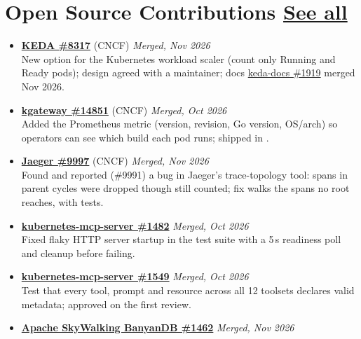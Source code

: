 \section*{Open Source Contributions \hfill
\href{https://uchihaithachi.github.io/cv/open-source.html}{See all}}
\BigDivider
\begin{itemize}[leftmargin=*, itemsep=0.3em, topsep=0.1em]
  \item \textbf{\href{https://github.com/kedacore/keda/pull/8317}{KEDA \#8317}} (CNCF) \hfill \textit{Merged, Nov 2026}\\
    New  option for the Kubernetes workload scaler (count only Running and Ready pods); design agreed with a maintainer; docs \href{https://github.com/kedacore/keda-docs/pull/1919}{keda-docs \#1919} merged Nov 2026.
  \item \textbf{\href{https://github.com/kgateway-dev/kgateway/pull/14851}{kgateway \#14851}} (CNCF) \hfill \textit{Merged, Oct 2026}\\
    Added the  Prometheus metric (version, revision, Go version, OS/arch) so operators can see which build each pod runs; shipped in .
  \item \textbf{\href{https://github.com/jaegertracing/jaeger/pull/9997}{Jaeger \#9997}} (CNCF) \hfill \textit{Merged, Nov 2026}\\
    Found and reported (\#9991) a bug in Jaeger's  trace-topology tool: spans in parent cycles were dropped though still counted; fix walks the spans no root reaches, with tests.
  \item \textbf{\href{https://github.com/containers/kubernetes-mcp-server/pull/1482}{kubernetes-mcp-server \#1482}} \hfill \textit{Merged, Oct 2026}\\
    Fixed flaky HTTP server startup in the  test suite with a 5\,s readiness poll and cleanup before failing.
  \item \textbf{\href{https://github.com/containers/kubernetes-mcp-server/pull/1549}{kubernetes-mcp-server \#1549}} \hfill \textit{Merged, Oct 2026}\\
    Test that every tool, prompt and resource across all 12 toolsets declares valid  metadata; approved on the first review.
  \item \textbf{\href{https://github.com/apache/skywalking-banyandb/pull/1462}{Apache SkyWalking BanyanDB \#1462}} \hfill \textit{Merged, Nov 2026}\\

\end{itemize}
